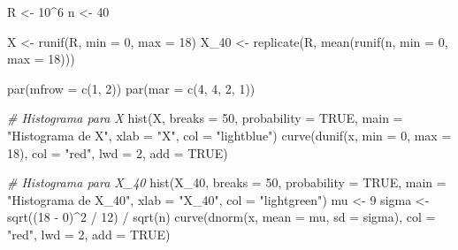 \documentclass[
]{article}
\newenvironment{Shaded}{}{}
\newcommand{\AttributeTok}[1]{\textcolor[rgb]{0.49,0.56,0.16}{#1}}
\newcommand{\CommentTok}[1]{\textcolor[rgb]{0.38,0.63,0.69}{\textit{#1}}}
\newcommand{\ConstantTok}[1]{\textcolor[rgb]{0.53,0.00,0.00}{#1}}
\newcommand{\DecValTok}[1]{\textcolor[rgb]{0.25,0.63,0.44}{#1}}
\newcommand{\FunctionTok}[1]{\textcolor[rgb]{0.02,0.16,0.49}{#1}}
\newcommand{\NormalTok}[1]{#1}
\newcommand{\OtherTok}[1]{\textcolor[rgb]{0.00,0.44,0.13}{#1}}
\newcommand{\SpecialCharTok}[1]{\textcolor[rgb]{0.25,0.44,0.63}{#1}}
\newcommand{\StringTok}[1]{\textcolor[rgb]{0.25,0.44,0.63}{#1}}
\begin{document}
\begin{Shaded}
\begin{Highlighting}[]
\NormalTok{R }\OtherTok{\textless{}{-}} \DecValTok{10}\SpecialCharTok{\^{}}\DecValTok{6}
\NormalTok{n }\OtherTok{\textless{}{-}} \DecValTok{40}

\NormalTok{X }\OtherTok{\textless{}{-}} \FunctionTok{runif}\NormalTok{(R, }\AttributeTok{min =} \DecValTok{0}\NormalTok{, }\AttributeTok{max =} \DecValTok{18}\NormalTok{)}
\NormalTok{X\_40 }\OtherTok{\textless{}{-}} \FunctionTok{replicate}\NormalTok{(R, }\FunctionTok{mean}\NormalTok{(}\FunctionTok{runif}\NormalTok{(n, }\AttributeTok{min =} \DecValTok{0}\NormalTok{, }\AttributeTok{max =} \DecValTok{18}\NormalTok{)))}

\FunctionTok{par}\NormalTok{(}\AttributeTok{mfrow =} \FunctionTok{c}\NormalTok{(}\DecValTok{1}\NormalTok{, }\DecValTok{2}\NormalTok{))}
\FunctionTok{par}\NormalTok{(}\AttributeTok{mar =} \FunctionTok{c}\NormalTok{(}\DecValTok{4}\NormalTok{, }\DecValTok{4}\NormalTok{, }\DecValTok{2}\NormalTok{, }\DecValTok{1}\NormalTok{))  }

\CommentTok{\# Histograma para X}
\FunctionTok{hist}\NormalTok{(X, }\AttributeTok{breaks =} \DecValTok{50}\NormalTok{, }\AttributeTok{probability =} \ConstantTok{TRUE}\NormalTok{, }\AttributeTok{main =} \StringTok{"Histograma de X"}\NormalTok{, }\AttributeTok{xlab =} \StringTok{"X"}\NormalTok{, }\AttributeTok{col =} \StringTok{"lightblue"}\NormalTok{)}
\FunctionTok{curve}\NormalTok{(}\FunctionTok{dunif}\NormalTok{(x, }\AttributeTok{min =} \DecValTok{0}\NormalTok{, }\AttributeTok{max =} \DecValTok{18}\NormalTok{), }\AttributeTok{col =} \StringTok{"red"}\NormalTok{, }\AttributeTok{lwd =} \DecValTok{2}\NormalTok{, }\AttributeTok{add =} \ConstantTok{TRUE}\NormalTok{)}

\CommentTok{\# Histograma para X\_40}
\FunctionTok{hist}\NormalTok{(X\_40, }\AttributeTok{breaks =} \DecValTok{50}\NormalTok{, }\AttributeTok{probability =} \ConstantTok{TRUE}\NormalTok{, }\AttributeTok{main =} \StringTok{"Histograma de X\_40"}\NormalTok{, }\AttributeTok{xlab =} \StringTok{"X\_40"}\NormalTok{, }\AttributeTok{col =} \StringTok{"lightgreen"}\NormalTok{)}
\NormalTok{mu }\OtherTok{\textless{}{-}} \DecValTok{9}  
\NormalTok{sigma }\OtherTok{\textless{}{-}} \FunctionTok{sqrt}\NormalTok{((}\DecValTok{18} \SpecialCharTok{{-}} \DecValTok{0}\NormalTok{)}\SpecialCharTok{\^{}}\DecValTok{2} \SpecialCharTok{/} \DecValTok{12}\NormalTok{) }\SpecialCharTok{/} \FunctionTok{sqrt}\NormalTok{(n)  }
\FunctionTok{curve}\NormalTok{(}\FunctionTok{dnorm}\NormalTok{(x, }\AttributeTok{mean =}\NormalTok{ mu, }\AttributeTok{sd =}\NormalTok{ sigma), }\AttributeTok{col =} \StringTok{"red"}\NormalTok{, }\AttributeTok{lwd =} \DecValTok{2}\NormalTok{, }\AttributeTok{add =} \ConstantTok{TRUE}\NormalTok{)}
\end{Highlighting}
\end{Shaded}
\end{document}
